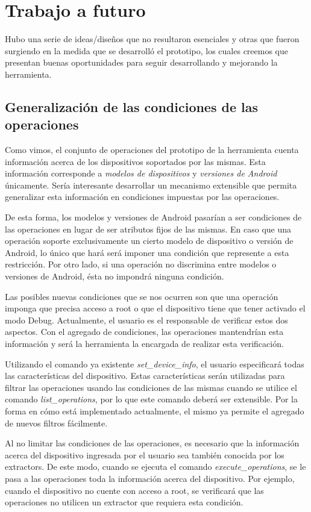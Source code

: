 \chapter{Trabajo a futuro}
Hubo una serie de ideas/diseños que no resultaron esenciales y otras que fueron surgiendo en la medida que se desarrolló el prototipo, los cuales creemos que presentan buenas oportunidades para seguir desarrollando y mejorando la herramienta.

\section{Generalización de las condiciones de las operaciones}
Como vimos, el conjunto de operaciones del prototipo de la herramienta cuenta información acerca de los dispositivos soportados por las mismas. Esta información corresponde a \emph{modelos de dispositivos} y \emph{versiones de Android} únicamente. Sería interesante desarrollar un mecanismo extensible que permita generalizar esta información en condiciones impuestas por las operaciones. 

De esta forma, los modelos y versiones de Android pasarían a ser condiciones de las operaciones en lugar de ser atributos fijos de las mismas. En caso que una operación soporte exclusivamente un cierto modelo de dispositivo o versión de Android, lo único que hará será imponer una condición que represente a esta restricción. Por otro lado, si una operación no discrimina entre modelos o versiones de Android, ésta no impondrá ninguna condición.

Las posibles nuevas condiciones que se nos ocurren son que una operación imponga que precisa acceso a root o que el dispositivo tiene que tener activado el modo Debug. Actualmente, el usuario es el responsable de verificar estos dos aspectos. Con el agregado de condiciones, las operaciones mantendrían esta información y será la herramienta la encargada de realizar esta verificación. 

Utilizando el comando ya existente \emph{set\_device\_info}, el usuario especificará todas las características del dispositivo. Estas características serán utilizadas para filtrar las operaciones usando las condiciones de las mismas cuando se utilice el comando \emph{list\_operations}, por lo que este comando deberá ser extensible. Por la forma en cómo está implementado actualmente, el mismo ya permite el agregado de nuevos filtros fácilmente. 

Al no limitar las condiciones de las operaciones, es necesario que la información acerca del dispositivo ingresada por el usuario sea también conocida por los extractors. De este modo, cuando se ejecuta el comando \emph{execute\_operations}, se le pasa a las operaciones toda la información acerca del dispositivo. Por ejemplo, cuando el dispositivo no cuente con acceso a root, se verificará que las operaciones no utilicen un extractor que requiera esta condición.


